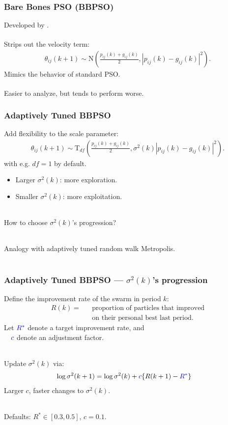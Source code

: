 \documentclass[xcolor=dvipsnames]{beamer}
\begin{document}
\begin{frame}
\frametitle{Bare Bones PSO (BBPSO)}
Developed by \citet{kennedy2003bare}.\\~\\

Strips out the velocity term:
\begin{align*}
\theta_{ij}(k+1) \sim \mathrm{N}\left(\frac{p_{ij}(k) + g_{ij}(k)}{2}, |p_{ij}(k) - g_{ij}(k)|^2\right).
\end{align*}
Mimics the behavior of standard PSO.\\~\\

Easier to analyze, but tends to perform worse.
\end{frame}

\begin{frame}
\frametitle{Adaptively Tuned BBPSO}
Add flexibility to the scale parameter:
\begin{align*}
\theta_{ij}(k+1) \sim \mathrm{T}_{df}\left(\frac{p_{ij}(k) + g_{ij}(k)}{2}, \sigma^2(k)|p_{ij}(k) - g_{ij}(k)|^2\right).
\end{align*}
with e.g. $df = 1$ by default.
\begin{itemize}
\item Larger $\sigma^2(k)$: more exploration.
\item Smaller $\sigma^2(k)$: more exploitation.\\~\\
\end{itemize}
How to choose $\sigma^2(k)$'s progression? \\~\\

\pause

Analogy with adaptively tuned random walk Metropolis.\\
\ \  \citep{andrieu2008tutorial}
\end{frame}

\begin{frame}
\frametitle{Adaptively Tuned BBPSO --- $\sigma^2(k)$'s progression}
Define the improvement rate of the swarm in period $k$:
\begin{align*}
R(k) = &&  \mbox{proportion of particles that improved}\\
       &&  \mbox{on their personal best last period.}
\end{align*}
\pause
Let ${\color{blue}R^*}$ denote a target improvement rate, and\\
\ \ ${\color{blue}c}$ denote an adjustment factor.\\~

Update $\sigma^2(k)$ via:
\begin{align*}
\log \sigma^2(k+1) &= \log\sigma^2(k) + {\color{blue}c}\{R(k+1) - {\color{blue}R^*}\}
\end{align*}
\pause
Larger $c$, faster changes to $\sigma^2(k)$.\\~

\pause

Defaults: $R^*\in[0.3, 0.5]$, $c = 0.1$.
\end{frame}
\end{document}
